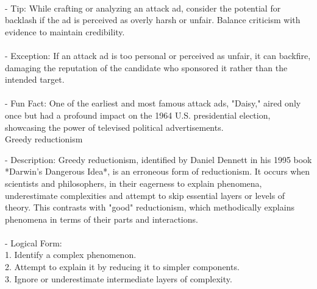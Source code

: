 \documentclass[a4paper,12pt,single,pdftex]{scrartcl}
\begin{document}
    
      
    \\

    
      - Tip: While crafting or analyzing an attack ad, consider the potential for backlash if the ad is perceived as overly harsh or unfair. Balance criticism with evidence to maintain credibility.
    \\

    
      
    \\

    
      - Exception: If an attack ad is too personal or perceived as unfair, it can backfire, damaging the reputation of the candidate who sponsored it rather than the intended target.
    \\

    
      
    \\

    
      - Fun Fact: One of the earliest and most famous attack ads, "Daisy," aired only once but had a profound impact on the 1964 U.S. presidential election, showcasing the power of televised political advertisements.
    \\

  

Greedy reductionism
    
      - Description: Greedy reductionism, identified by Daniel Dennett in his 1995 book *Darwin's Dangerous Idea*, is an erroneous form of reductionism. It occurs when scientists and philosophers, in their eagerness to explain phenomena, underestimate complexities and attempt to skip essential layers or levels of theory. This contrasts with "good" reductionism, which methodically explains phenomena in terms of their parts and interactions.
    \\

    
      
    \\

    
      - Logical Form:
    \\

    
        1. Identify a complex phenomenon.
    \\

    
        2. Attempt to explain it by reducing it to simpler components.
    \\

    
        3. Ignore or underestimate intermediate layers of complexity.
    \\
\end{document}

